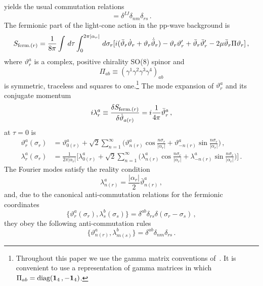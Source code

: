 \documentclass[12pt]{article}
\def\a{\alpha}
\def\g{\gamma}
\def\d{\delta}
\def\m{\mu}
\def\s{\sigma}
\def\l{\lambda}
\def\t{\tau}
\def\vt{\vartheta}
\def\dg{\dagger}
\numberwithin{equation}{section} \setlength{\textwidth}{17cm}
\begin{document}
yields the usual commutation relations
\begin{equation}
[a_{n(r)}^I,a_{m(s)}^{J\,\dg}]=\d^{IJ}\d_{nm}\d_{rs}\,.
\end{equation}
The fermionic part of the light-cone action in the pp-wave background is~\cite{m}
\begin{equation}
S_{\mbox{\scriptsize ferm.}(r)}=\frac{1}{8\pi}\int\,d\t\int_0^{2\pi|\a_r|}\,d\s_r
[i(\bar{\vt}_r\dot{\vt}_r+\vt_r\dot{\bar{\vt}}_r)
-\vt_r\vt'_r+\bar{\vt}_r\bar{\vt}'_r-2\m\bar{\vt}_r\Pi\vt_r]\,,
\end{equation}
where $\vt^a_r$ is a complex, positive chirality SO(8) spinor and
\begin{equation}
\Pi_{ab}\equiv(\g^1\g^2\g^3\g^4)_{ab}
\end{equation}
is symmetric, traceless and squares to one.\footnote{Throughout this paper we use
the gamma matrix conventions of~\cite{gsb}. It is convenient to use a representation of gamma matrices in which 
$\Pi_{ab}=\text{diag}({\bf 1}_4\,,-{\bf 1}_4)$.}
The mode expansion of $\vt^a_r$ and its conjugate momentum
\begin{equation}
i\l^a_r\equiv \frac{\delta S_{\mbox{\scriptsize ferm.}(r)}}{\delta \dot{\vt}_{a(r)}}=
i\frac{1}{4\pi}\bar{\vt}^a_r\,,
\end{equation}
at $\t=0$ is
\begin{equation}
\begin{split}
\vt^a_r(\s_r) & =\vt^a_{0(r)}+\sqrt{2}\sum_{n=1}^{\infty}
\bigl(\vt^a_{n(r)}\cos\frac{n\s_r}{|\a_r|}+\vt^a_{-n(r)}\sin\frac{n\s_r}{|\a_r|}\bigr)\,,\\
\l^a_r(\s_r) & =\frac{1}{2\pi|\a_r|}\bigl[\l^a_{0(r)}+\sqrt{2}\sum_{n=1}^{\infty}
\bigl(\l^a_{n(r)}\cos\frac{n\s_r}{|\a_r|}+\l^a_{-n(r)}\sin\frac{n\s_r}{|\a_r|}\bigr)\bigr]\,.
\end{split}
\end{equation}
The Fourier modes satisfy the reality condition
\begin{equation}
\l_{n(r)}^a=\frac{|\a_r|}{2}\bar{\vt}^a_{n(r)}\,,
\end{equation}
and, due to the canonical anti-commutation relations for the fermionic coordinates
\begin{equation}
\{\vt^a_r(\s_r),\l^b_s(\s_s)\}=\d^{ab}\d_{rs}\d(\s_r-\s_s)\,,
\end{equation}
they obey the following anti-commutation rules
\begin{equation}
\{\vt^a_{n(r)},\l^b_{m(s)}\}=\d^{ab}\d_{nm}\d_{rs}\,.
\end{equation}
\end{document}
